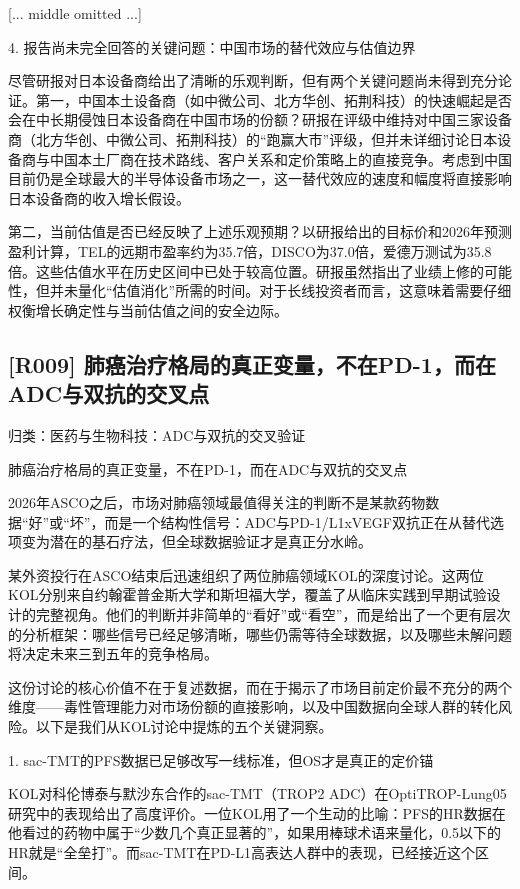 \documentclass[11pt]{ctexart}
\begin{document}
[... middle omitted ...]

4. 报告尚未完全回答的关键问题：中国市场的替代效应与估值边界

尽管研报对日本设备商给出了清晰的乐观判断，但有两个关键问题尚未得到充分论证。第一，中国本土设备商（如中微公司、北方华创、拓荆科技）的快速崛起是否会在中长期侵蚀日本设备商在中国市场的份额？研报在评级中维持对中国三家设备商（北方华创、中微公司、拓荆科技）的“跑赢大市”评级，但并未详细讨论日本设备商与中国本土厂商在技术路线、客户关系和定价策略上的直接竞争。考虑到中国目前仍是全球最大的半导体设备市场之一，这一替代效应的速度和幅度将直接影响日本设备商的收入增长假设。

第二，当前估值是否已经反映了上述乐观预期？以研报给出的目标价和2026年预测盈利计算，TEL的远期市盈率约为35.7倍，DISCO为37.0倍，爱德万测试为35.8倍。这些估值水平在历史区间中已处于较高位置。研报虽然指出了业绩上修的可能性，但并未量化“估值消化”所需的时间。对于长线投资者而言，这意味着需要仔细权衡增长确定性与当前估值之间的安全边际。

\subsection{[R009] 肺癌治疗格局的真正变量，不在PD-1，而在ADC与双抗的交叉点}
{\small\color{refgray}归类：医药与生物科技：ADC与双抗的交叉验证}

肺癌治疗格局的真正变量，不在PD-1，而在ADC与双抗的交叉点

2026年ASCO之后，市场对肺癌领域最值得关注的判断不是某款药物数据“好”或“坏”，而是一个结构性信号：ADC与PD-1/L1xVEGF双抗正在从替代选项变为潜在的基石疗法，但全球数据验证才是真正分水岭。

某外资投行在ASCO结束后迅速组织了两位肺癌领域KOL的深度讨论。这两位KOL分别来自约翰霍普金斯大学和斯坦福大学，覆盖了从临床实践到早期试验设计的完整视角。他们的判断并非简单的“看好”或“看空”，而是给出了一个更有层次的分析框架：哪些信号已经足够清晰，哪些仍需等待全球数据，以及哪些未解问题将决定未来三到五年的竞争格局。

这份讨论的核心价值不在于复述数据，而在于揭示了市场目前定价最不充分的两个维度——毒性管理能力对市场份额的直接影响，以及中国数据向全球人群的转化风险。以下是我们从KOL讨论中提炼的五个关键洞察。

1. sac-TMT的PFS数据已足够改写一线标准，但OS才是真正的定价锚

KOL对科伦博泰与默沙东合作的sac-TMT（TROP2 ADC）在OptiTROP-Lung05研究中的表现给出了高度评价。一位KOL用了一个生动的比喻：PFS的HR数据在他看过的药物中属于“少数几个真正显著的”，如果用棒球术语来量化，0.5以下的HR就是“全垒打”。而sac-TMT在PD-L1高表达人群中的表现，已经接近这个区间。
\end{document}
